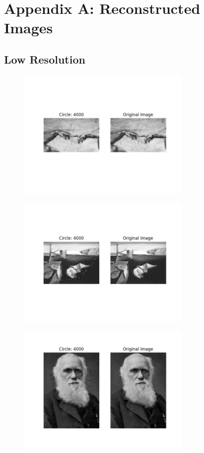 \documentclass[12pt]{article}
\begin{document}
\newpage
\section*{Appendix A: Reconstructed Images}

\subsection*{Low Resolution}
\begin{figure}[H]
\centering
\noindent\includegraphics[width=0.75\textwidth]{../results/adam/adam_4000}
\end{figure}

\begin{figure}[H]
\centering
\noindent\includegraphics[width=0.75\textwidth]{../results/dali/dali_4000}
\end{figure}

\begin{figure}[H]
\centering
\noindent\includegraphics[width=0.75\textwidth]{../results/darwin/darwin_4000}
\end{figure}
\end{document}
